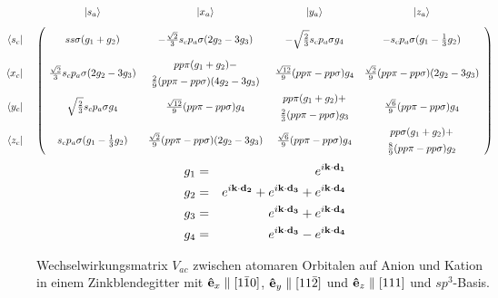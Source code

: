 \begin{sidewaysfloateqnum}
  \begin{equation}
    \label{eq:tba-sp3}
    \left(\begin{array}{@{\hspace{-9ex}}r@{\hspace{6ex}}cccc}
%
& \raisebox{2.0em}[0ex][0ex]{\ket{s_{a}}} 
& \raisebox{2.0em}[0ex][0ex]{\ket{x_{a}}} 
& \raisebox{2.0em}[0ex][0ex]{\ket{y_{a}}} 
& \raisebox{2.0em}[0ex][0ex]{\ket{z_{a}}} \\[-2ex]
\bra{s_{c}}
& ss\sigma (g_{1}+g_{2}) 
& - \frac{\sqrt{2}}{3} s_{c}p_{a}\sigma (2g_{2}-3g_{3})
& - \sqrt{\frac{2}{3}} s_{c}p_{a}\sigma g_{4}
& - s_{c}p_{a}\sigma (g_{1}-\frac{1}{3} g_{2})\\[3ex]
\bra{x_{c}}
& \frac{\sqrt{2}}{3} s_{c}p_{a}\sigma (2g_{2}-3g_{3})
& \begin{array}[c]{c}
pp\pi(g_{1}+g_{2}) - \\[1ex]
\frac{2}{9} (pp\pi - pp\sigma) (4g_{2}-3g_{3})
\end{array}
& \frac{\sqrt{12}}{9} (pp\pi - pp\sigma) g_{4}
&  \frac{\sqrt{2}}{9} (pp\pi - pp\sigma) (2g_{2}-3g_{3})\\[3ex]
\bra{y_{c}}
& \sqrt{\frac{2}{3}} s_{c}p_{a}\sigma g_{4}
& \frac{\sqrt{12}}{9} (pp\pi - pp\sigma) g_{4} 
& \begin{array}[c]{c}
pp\pi(g_{1}+g_{2}) +\\[1ex]
\frac{2}{3} (pp\pi - pp\sigma) g_{3}
\end{array}
& \frac{\sqrt{6}}{9} (pp\pi - pp\sigma) g_{4}\\[3ex]
\bra{z_{c}}
& s_{c}p_{a}\sigma (g_{1}-\frac{1}{3} g_{2})
& \frac{\sqrt{2}}{9} (pp\pi - pp\sigma) (2g_{2}-3g_{3})
& \frac{\sqrt{6}}{9} (pp\pi - pp\sigma) g_{4}
& \begin{array}[c]{c}
pp\sigma (g_{1}+g_{2}) + \\[1ex]
\frac{8}{9} (pp\pi - pp\sigma) g_{2}
\end{array}
    \end{array}\right)
  \end{equation}
  \begin{eqnarray*}
    g_{1} &=& e^{i \mathbf{k} \cdot \mathbf{d_{1}} }\\
    g_{2} &=& e^{i \mathbf{k} \cdot \mathbf{d_{2}} } + e^{i \mathbf{k} \cdot \mathbf{d_{3}} } 
            + e^{i \mathbf{k} \cdot \mathbf{d_{4}} } \\
    g_{3} &=& e^{i \mathbf{k} \cdot \mathbf{d_{3}} } + e^{i \mathbf{k} \cdot \mathbf{d_{4}} }\\  
    g_{4} &=& e^{i \mathbf{k} \cdot \mathbf{d_{3}} } - e^{i \mathbf{k} \cdot \mathbf{d_{4}} }\\
  \end{eqnarray*}
\caption{Wechselwirkungsmatrix $V_{ac}$ zwischen atomaren Orbitalen auf Anion
  und Kation in einem Zinkblendegitter mit $\mathbf{\protect\hat e}_{x} \parallel [1 \bar{1} 0]$, $\mathbf{\protect\hat e}_{y}
  \parallel [1 1 \bar{2}]$ und $\mathbf{\protect\hat e}_{z} \parallel [111]$ und $sp^{3}$-Basis.}
\end{sidewaysfloateqnum}



